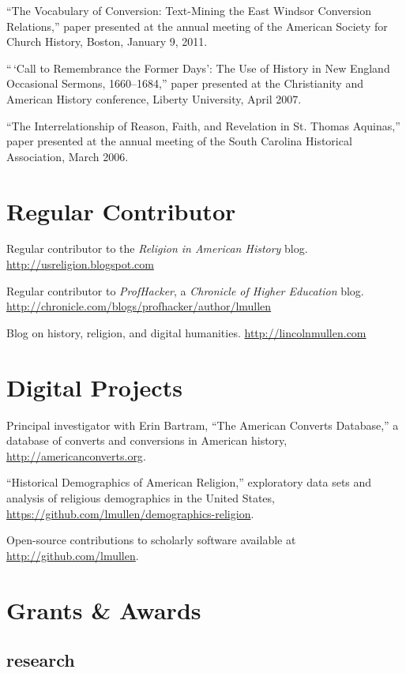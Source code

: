 \documentclass[11pt]{article}
\begin{document}
``The Vocabulary of Conversion: Text-Mining the East Windsor Conversion
Relations,'' paper presented at the annual meeting of the American
Society for Church History, Boston, January 9, 2011.

``\,`Call to Remembrance the Former Days': The Use of History in New
England Occasional Sermons, 1660--1684,'' paper presented at the
Christianity and American History conference, Liberty University, April
2007.

``The Interrelationship of Reason, Faith, and Revelation in St. Thomas
Aquinas,'' paper presented at the annual meeting of the South Carolina
Historical Association, March 2006.

\section{Regular Contributor}

Regular contributor to the \emph{Religion in American History} blog. 
\href{http://usreligion.blogspot.com}{http://usreligion.blogspot.com}

Regular contributor to \emph{ProfHacker}, a \emph{Chronicle of Higher
Education} blog.
\url{http://chronicle.com/blogs/profhacker/author/lmullen}

Blog on history, religion, and digital humanities.
\url{http://lincolnmullen.com}

\section{Digital Projects}

Principal investigator with Erin Bartram, ``The American Converts 
Database,'' a database of converts and conversions in American history, 
\href{http://americanconverts.org}{http://americanconverts.org}.

``Historical Demographics of American Religion,'' exploratory data sets and 
analysis of religious demographics in the United States,  
\href{https://github.com/lmullen/demographics-religion}{https://github.com/lmullen/demographics-religion}.

Open-source contributions to scholarly software available at 
\href{http://github.com/lmullen}{http://github.com/lmullen}.

\section{Grants \& Awards}

\subsection{research}
\end{document}
